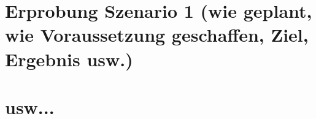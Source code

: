 \section{Erprobung Szenario 1 (wie geplant, wie Voraussetzung geschaffen, Ziel, Ergebnis usw.)}
\section{usw...}